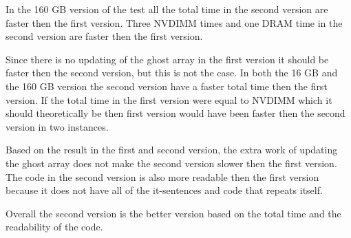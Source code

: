 \documentclass[12pt,a4paper,USenglish]{article}      %
\begin{document}
In the 160 GB version of the test all the total time in the second version are faster then the first version. Three NVDIMM times and one DRAM time in the second version are faster then the first version.

Since there is no updating of the ghost array in the first version it should be faster then the second version, but this is not the case. In both the 16 GB and the 160 GB version the second version have a faster total time then the first version. If the total time in the first version were equal to NVDIMM which it should theoretically be then first version would have been faster then the second version in two instances. 

Based on the result in the first and second version, the extra work of updating the ghost array does not make the second version slower then the first version. The code in the second version is also more readable then the first version because it does not have all of the it-sentences and code that repeats itself. 

Overall the second version is the better version based on the total time and the readability of the code. 

\end{document}
